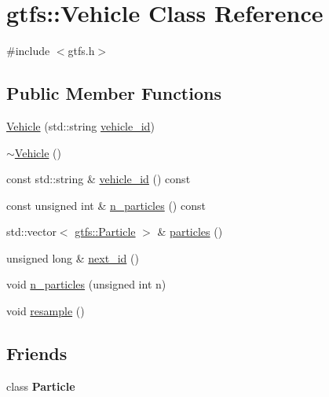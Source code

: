 \hypertarget{classgtfs_1_1Vehicle}{}\section{gtfs\+:\+:Vehicle Class Reference}
\label{classgtfs_1_1Vehicle}


{\ttfamily \#include $<$gtfs.\+h$>$}

\subsection*{Public Member Functions}
\begin{DoxyCompactItemize}
\item 
\hyperlink{classgtfs_1_1Vehicle_a011c9c3353ce1686ff783a4342f67dfd}{Vehicle} (std\+::string \hyperlink{classgtfs_1_1Vehicle_a8183a0cbc7ab58691b6c056b049ec033}{vehicle\+\_\+id})
\item 
\hyperlink{classgtfs_1_1Vehicle_a08c7450dd0df9406f78b30be044d27d8}{$\sim$\+Vehicle} ()
\item 
const std\+::string \& \hyperlink{classgtfs_1_1Vehicle_a8183a0cbc7ab58691b6c056b049ec033}{vehicle\+\_\+id} () const 
\item 
const unsigned int \& \hyperlink{classgtfs_1_1Vehicle_a53f697645a668f2f04375331fe147dc8}{n\+\_\+particles} () const 
\item 
std\+::vector$<$ \hyperlink{classgtfs_1_1Particle}{gtfs\+::\+Particle} $>$ \& \hyperlink{classgtfs_1_1Vehicle_a83c65fe9c837b76631ed0356a55b674b}{particles} ()
\item 
unsigned long \& \hyperlink{classgtfs_1_1Vehicle_a1d53d3b8a106d0ed967cb63926e79c34}{next\+\_\+id} ()
\item 
void \hyperlink{classgtfs_1_1Vehicle_a2afb781a1158e0e3e2960c1da21a04e8}{n\+\_\+particles} (unsigned int n)
\item 
void \hyperlink{classgtfs_1_1Vehicle_a46ee9775d11595461315be7141359d8a}{resample} ()
\end{DoxyCompactItemize}
\subsection*{Friends}
\begin{DoxyCompactItemize}
\item 
class {\bfseries Particle}\hypertarget{classgtfs_1_1Vehicle_a0f6381b33b90b7e4ab72eeaeec4cc9ff}{}\label{classgtfs_1_1Vehicle_a0f6381b33b90b7e4ab72eeaeec4cc9ff}

\end{DoxyCompactItemize}


